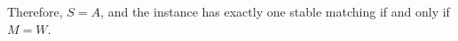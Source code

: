 \documentclass[14pt]{extreport}
\newcounter{counter}
\newcommand{\Exercise}{Exercise \stepcounter{counter}\thecounter}
\begin{document}
    \vspace{3mm}
    Therefore, $S = A$, and the instance has exactly one stable matching if and only if $M = W.$






    
\end{document}
